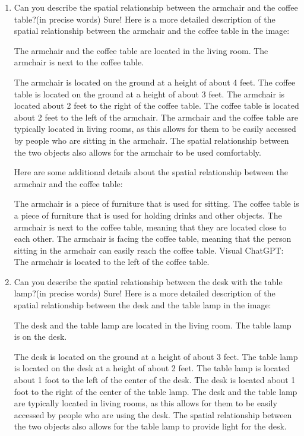 \begin{enumerate}
    \item Can you describe the spatial relationship between the armchair and the coffee table?(in precise words)
    \subitem 
    Sure! Here is a more detailed description of the spatial relationship between the armchair and the coffee table in the image:
    
    The armchair and the coffee table are located in the living room. The armchair is next to the coffee table.
    
    The armchair is located on the ground at a height of about 4 feet.
    The coffee table is located on the ground at a height of about 3 feet.
    The armchair is located about 2 feet to the right of the coffee table.
    The coffee table is located about 2 feet to the left of the armchair.
    The armchair and the coffee table are typically located in living rooms, as this allows for them to be easily accessed by people who are sitting in the armchair. The spatial relationship between the two objects also allows for the armchair to be used comfortably.
    
    Here are some additional details about the spatial relationship between the armchair and the coffee table:
    
    The armchair is a piece of furniture that is used for sitting.
    The coffee table is a piece of furniture that is used for holding drinks and other objects.
    The armchair is next to the coffee table, meaning that they are located close to each other.
    The armchair is facing the coffee table, meaning that the person sitting in the armchair can easily reach the coffee table.
    \subitem Visual ChatGPT: The armchair is located to the left of the coffee table.
    \item Can you describe the spatial relationship between the desk with the table lamp?(in precise words)
    \subitem Sure! Here is a more detailed description of the spatial relationship between the desk and the table lamp in the image:

    The desk and the table lamp are located in the living room. The table lamp is on the desk.
    
    The desk is located on the ground at a height of about 3 feet.
    The table lamp is located on the desk at a height of about 2 feet.
    The table lamp is located about 1 foot to the left of the center of the desk.
    The desk is located about 1 foot to the right of the center of the table lamp.
    The desk and the table lamp are typically located in living rooms, as this allows for them to be easily accessed by people who are using the desk. The spatial relationship between the two objects also allows for the table lamp to provide light for the desk.
    

\end{enumerate}
